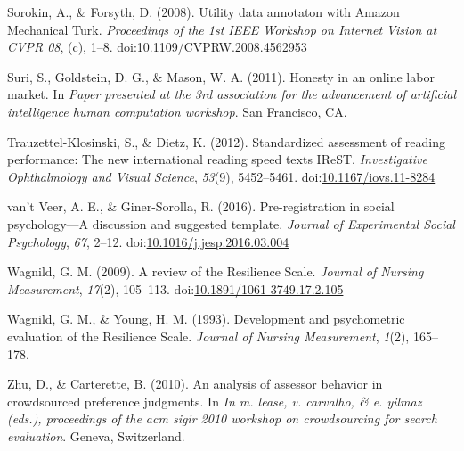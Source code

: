 \documentclass[english,man]{apa6}
\theoremstyle{definition}
\theoremstyle{definition}
\theoremstyle{definition}
\theoremstyle{remark}
\begin{document}
\hypertarget{ref-Sorokin2008}{}
Sorokin, A., \& Forsyth, D. (2008). Utility data annotaton with Amazon
Mechanical Turk. \emph{Proceedings of the 1st IEEE Workshop on Internet
Vision at CVPR 08}, (c), 1--8.
doi:\href{https://doi.org/10.1109/CVPRW.2008.4562953}{10.1109/CVPRW.2008.4562953}

\hypertarget{ref-Suri2011}{}
Suri, S., Goldstein, D. G., \& Mason, W. A. (2011). Honesty in an online
labor market. In \emph{Paper presented at the 3rd association for the
advancement of artificial intelligence human computation workshop}. San
Francisco, CA.

\hypertarget{ref-Trauzettel-Klosinski2012}{}
Trauzettel-Klosinski, S., \& Dietz, K. (2012). Standardized assessment
of reading performance: The new international reading speed texts IReST.
\emph{Investigative Ophthalmology and Visual Science}, \emph{53}(9),
5452--5461.
doi:\href{https://doi.org/10.1167/iovs.11-8284}{10.1167/iovs.11-8284}

\hypertarget{ref-VantVeer2016}{}
van't Veer, A. E., \& Giner-Sorolla, R. (2016). Pre-registration in
social psychology---A discussion and suggested template. \emph{Journal
of Experimental Social Psychology}, \emph{67}, 2--12.
doi:\href{https://doi.org/10.1016/j.jesp.2016.03.004}{10.1016/j.jesp.2016.03.004}

\hypertarget{ref-Wagnild2009}{}
Wagnild, G. M. (2009). A review of the Resilience Scale. \emph{Journal
of Nursing Measurement}, \emph{17}(2), 105--113.
doi:\href{https://doi.org/10.1891/1061-3749.17.2.105}{10.1891/1061-3749.17.2.105}

\hypertarget{ref-Wagnild1993}{}
Wagnild, G. M., \& Young, H. M. (1993). Development and psychometric
evaluation of the Resilience Scale. \emph{Journal of Nursing
Measurement}, \emph{1}(2), 165--178.

\hypertarget{ref-Zhu2010}{}
Zhu, D., \& Carterette, B. (2010). An analysis of assessor behavior in
crowdsourced preference judgments. In \emph{In m. lease, v. carvalho, \&
e. yilmaz (eds.), proceedings of the acm sigir 2010 workshop on
crowdsourcing for search evaluation}. Geneva, Switzerland.
\end{document}
